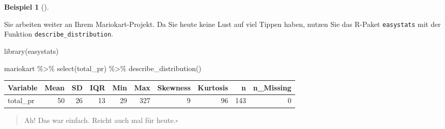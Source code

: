 \documentclass[
  a4paper,
]{scrbook}
\newenvironment{Shaded}{\begin{snugshade}}{\end{snugshade}}
\newcommand{\FunctionTok}[1]{\textcolor[rgb]{0.28,0.35,0.67}{#1}}
\newcommand{\NormalTok}[1]{\textcolor[rgb]{0.00,0.23,0.31}{#1}}
\newcommand{\SpecialCharTok}[1]{\textcolor[rgb]{0.37,0.37,0.37}{#1}}
\theoremstyle{definition}
\newtheorem{example}{Beispiel}[chapter]
\theoremstyle{definition}
\theoremstyle{definition}
\theoremstyle{remark}
\begin{document}
\begin{example}[]\protect\hypertarget{exm-sd-mario}{}\label{exm-sd-mario}

Sie arbeiten weiter an Ihrem Mariokart-Projekt. Da Sie heute keine Lust
auf viel Tippen haben, nutzen Sie das R-Paket \texttt{easystats} mit der
Funktion \texttt{describe\_distribution}.

\begin{Shaded}
\begin{Highlighting}[]
\FunctionTok{library}\NormalTok{(easystats)}

\NormalTok{mariokart }\SpecialCharTok{\%\textgreater{}\%} 
  \FunctionTok{select}\NormalTok{(total\_pr) }\SpecialCharTok{\%\textgreater{}\%} 
  \FunctionTok{describe\_distribution}\NormalTok{()}
\end{Highlighting}
\end{Shaded}

\begin{longtable}[]{@{}lrrrrrrrrr@{}}
\toprule\noalign{}
Variable & Mean & SD & IQR & Min & Max & Skewness & Kurtosis & n &
n\_Missing \\
\midrule\noalign{}
\endhead
\bottomrule\noalign{}
\endlastfoot
total\_pr & 50 & 26 & 13 & 29 & 327 & 9 & 96 & 143 & 0 \\
\end{longtable}

\begin{quote}
{} Ah! Das war einfach. Reicht auch mal für
heute.\(\square\)
\end{quote}

\end{example}
\end{document}
